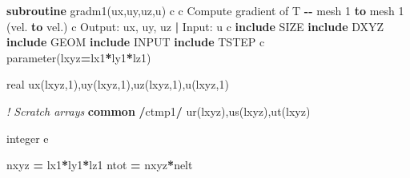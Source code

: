\documentclass[
]{scrartcl}
\newenvironment{Shaded}{}{}
\newcommand{\CommentTok}[1]{\textcolor[rgb]{0.38,0.63,0.69}{\textit{#1}}}
\newcommand{\DataTypeTok}[1]{\textcolor[rgb]{0.56,0.13,0.00}{#1}}
\newcommand{\DecValTok}[1]{\textcolor[rgb]{0.25,0.63,0.44}{#1}}
\newcommand{\KeywordTok}[1]{\textcolor[rgb]{0.00,0.44,0.13}{\textbf{#1}}}
\newcommand{\NormalTok}[1]{#1}
\newcommand{\StringTok}[1]{\textcolor[rgb]{0.25,0.44,0.63}{#1}}
\begin{document}
\begin{Shaded}
\begin{Highlighting}[]
       \KeywordTok{subroutine}\NormalTok{ gradm1(ux,uy,uz,u)}
\NormalTok{ c}
\NormalTok{ c     Compute gradient of T }\KeywordTok{{-}{-}}\NormalTok{ mesh }\DecValTok{1} \KeywordTok{to}\NormalTok{ mesh }\DecValTok{1}\NormalTok{ (vel. }\KeywordTok{to}\NormalTok{ vel.)}
\NormalTok{ c     Output: ux, uy, uz  }\KeywordTok{|}\NormalTok{ Input: u}
\NormalTok{ c}
       \KeywordTok{include} \StringTok{\textquotesingle{}SIZE\textquotesingle{}}
       \KeywordTok{include} \StringTok{\textquotesingle{}DXYZ\textquotesingle{}}
       \KeywordTok{include} \StringTok{\textquotesingle{}GEOM\textquotesingle{}}
       \KeywordTok{include} \StringTok{\textquotesingle{}INPUT\textquotesingle{}}
       \KeywordTok{include} \StringTok{\textquotesingle{}TSTEP\textquotesingle{}}
\NormalTok{ c}
       \DataTypeTok{parameter}\NormalTok{(lxyz}\KeywordTok{=}\NormalTok{lx1}\KeywordTok{*}\NormalTok{ly1}\KeywordTok{*}\NormalTok{lz1)}
 
       \DataTypeTok{real}\NormalTok{ ux(lxyz,}\DecValTok{1}\NormalTok{),uy(lxyz,}\DecValTok{1}\NormalTok{),uz(lxyz,}\DecValTok{1}\NormalTok{),u(lxyz,}\DecValTok{1}\NormalTok{)}
 
       \CommentTok{! Scratch arrays}
       \KeywordTok{common} \KeywordTok{/}\NormalTok{ctmp1}\KeywordTok{/}\NormalTok{ ur(lxyz),us(lxyz),ut(lxyz)}
 
       \DataTypeTok{integer}\NormalTok{ e}
 
\NormalTok{       nxyz }\KeywordTok{=}\NormalTok{ lx1}\KeywordTok{*}\NormalTok{ly1}\KeywordTok{*}\NormalTok{lz1}
\NormalTok{       ntot }\KeywordTok{=}\NormalTok{ nxyz}\KeywordTok{*}\NormalTok{nelt}
 

\end{Highlighting}
\end{Shaded}
\end{document}
